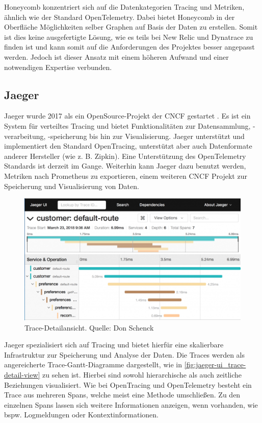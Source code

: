Honeycomb konzentriert sich auf die Datenkategorien Tracing und Metriken, ähnlich wie der Standard OpenTelemetry. Dabei bietet Honeycomb in der Oberfläche Möglichkeiten selber Graphen auf Basis der Daten zu erstellen. Somit ist dies keine ausgefertigte Lösung, wie es teils bei New Relic und Dynatrace zu finden ist und kann somit auf die Anforderungen des Projektes besser angepasst werden. Jedoch ist dieser Ansatz mit einem höheren Aufwand und einer notwendigen Expertise verbunden.

\subsection{Jaeger}

Jaeger wurde 2017 als ein OpenSource-Projekt der CNCF gestartet \cite{Jaeger}. Es ist ein System für verteiltes Tracing und bietet Funktionalitäten zur Datensammlung, -verarbeitung, -speicherung bis hin zur Visualisierung. Jaeger unterstützt und implementiert den Standard OpenTracing, unterstützt aber auch Datenformate anderer Hersteller (wie z. B. Zipkin). Eine Unterstützung des OpenTelemetry Standards ist derzeit im Gange. Weiterhin kann Jaeger dazu benutzt werden, Metriken nach Prometheus \cite{Prometheus} zu exportieren, einem weiteren CNCF Projekt zur Speicherung und Visualisierung von Daten.

\begin{figure}
\centering
\includegraphics[width=\linewidth]{img/03_methoden/redhat_jaeger-ui_trace-detail-view.png}
\caption{Trace-Detailansicht. Quelle: Don Schenck \cite{JaegerIstioTracing}}
\label{fig:jaeger-ui_trace-detail-view}
\end{figure}

Jaeger spezialisiert sich auf Tracing und bietet hierfür eine skalierbare Infrastruktur zur Speicherung und Analyse der Daten. Die Traces werden als angereicherte Trace-Gantt-Diagramme dargestellt, wie in \autoref{fig:jaeger-ui_trace-detail-view} zu sehen ist. Hierbei sind sowohl hierarchische als auch zeitliche Beziehungen visualisiert. Wie bei OpenTracing und OpenTelemetry besteht ein Trace aus mehreren Spans, welche meist eine Methode umschließen. Zu den einzelnen Spans lassen sich weitere Informationen anzeigen, wenn vorhanden, wie bspw. Logmeldungen oder Kontextinformationen.

